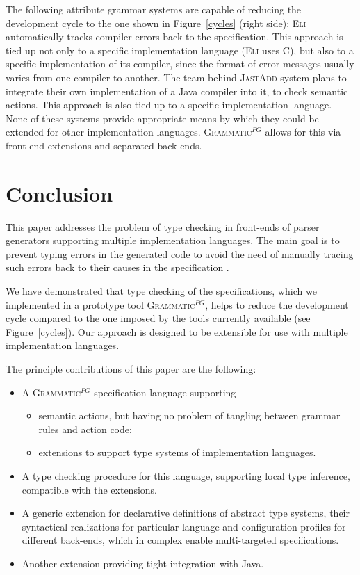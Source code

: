\documentclass{llncs2e/llncs}
\newcommand{\figref}[1]{Figure~\ref{#1}}
\newcommand{\tool}[1]{\textsc{#1}}
\newcommand{\ATF}{\textsc{Grammatic}$^{PG}$}
\begin{document}
The following attribute grammar systems are capable of reducing the development cycle to the one shown in \figref{cycles} (right side): \tool{Eli} \cite{Eli} automatically tracks compiler errors back to the specification. This approach is tied up not only to a specific implementation language (\tool{Eli} uses C), but also to a specific implementation of its compiler, since the format of error messages usually varies from one compiler to another.
The team behind \tool{JastAdd} \cite{JastAdd} system plans to integrate their own implementation of a Java compiler into it, to check semantic actions. This approach is also tied up to a specific implementation language. None of these systems provide appropriate means by which they could be extended for other implementation languages. \ATF{} allows for this via front-end extensions and separated back ends.


\section{Conclusion}\label{Conclusion}

This paper addresses the problem of type checking in front-ends of parser generators supporting multiple implementation languages. The main goal is to prevent typing errors in the generated code to avoid the need of manually tracing such errors back to their causes in the specification . 

We have demonstrated that type checking of the specifications, which we implemented in a prototype tool \ATF{}, helps to reduce the development cycle compared to the one imposed by the tools currently available (see \figref{cycles}). Our approach is designed to be extensible for use with multiple implementation languages.

The principle contributions of this paper are the following:
\begin{itemize}
	\item A \ATF{} specification language supporting 
		\begin{itemize}
			\item semantic actions, but having no problem of tangling between grammar rules and action code;
			\item extensions to support type systems of implementation languages.
		\end{itemize}
	\item A type checking procedure for this language, supporting local type inference, compatible with the extensions.
	\item A generic extension for declarative definitions of abstract type systems, their syntactical realizations for particular language and configuration profiles for different back-ends, which in complex enable multi-targeted specifications.
	\item Another extension providing tight integration with Java.
\end{itemize}
\end{document}
